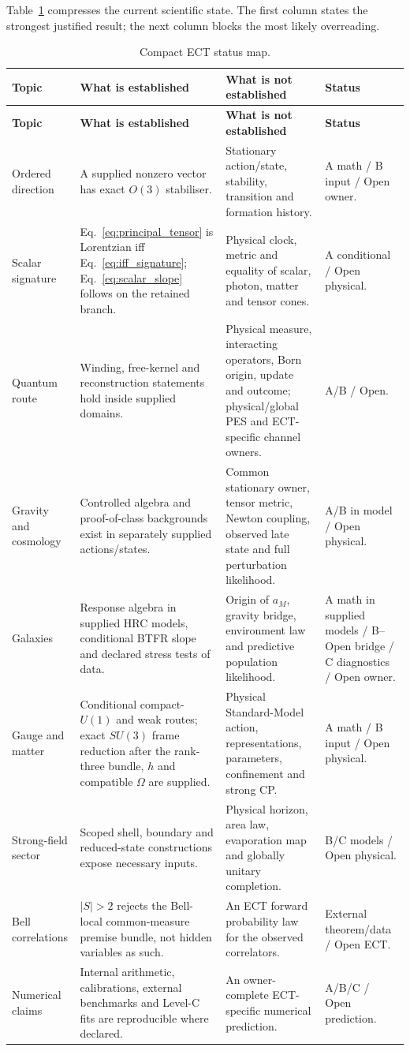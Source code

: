 \documentclass[11pt,a4paper]{article}
\begin{document}
Table~\ref{tab:status_map} compresses the current scientific state.  The
first column states the strongest justified result; the next column blocks
the most likely overreading.

\small
\begin{longtable}{@{}p{2.7cm}p{4.7cm}p{4.7cm}p{2.6cm}@{}}
\caption{Compact ECT status map.}\label{tab:status_map}\\
\toprule
\textbf{Topic} & \textbf{What is established} & \textbf{What is not established} & \textbf{Status}\\
\midrule
\endfirsthead
\toprule
\textbf{Topic} & \textbf{What is established} & \textbf{What is not established} & \textbf{Status}\\
\midrule
\endhead
\bottomrule
\endfoot
Ordered direction & A supplied nonzero vector has exact $O(3)$ stabiliser. & Stationary action/state, stability, transition and formation history. & A math / B input / Open owner.\\
Scalar signature & Eq.~\eqref{eq:principal_tensor} is Lorentzian iff Eq.~\eqref{eq:iff_signature}; Eq.~\eqref{eq:scalar_slope} follows on the retained branch. & Physical clock, metric and equality of scalar, photon, matter and tensor cones. & A conditional / Open physical.\\
Quantum route & Winding, free-kernel and reconstruction statements hold inside supplied domains. & Physical measure, interacting operators, Born origin, update and outcome; physical/global PES and ECT-specific channel owners. & A/B / Open.\\
Gravity and cosmology & Controlled algebra and proof-of-class backgrounds exist in separately supplied actions/states. & Common stationary owner, tensor metric, Newton coupling, observed late state and full perturbation likelihood. & A/B in model / Open physical.\\
Galaxies & Response algebra in supplied HRC models, conditional BTFR slope and declared stress tests of data. & Origin of $a_M$, gravity bridge, environment law and predictive population likelihood. & A math in supplied models / B--Open bridge / C diagnostics / Open owner.\\
Gauge and matter & Conditional compact-$U(1)$ and weak routes; exact $SU(3)$ frame reduction after the rank-three bundle, $h$ and compatible $\Omega$ are supplied. & Physical Standard-Model action, representations, parameters, confinement and strong CP. & A math / B input / Open physical.\\
Strong-field sector & Scoped shell, boundary and reduced-state constructions expose necessary inputs. & Physical horizon, area law, evaporation map and globally unitary completion. & B/C models / Open physical.\\
Bell correlations & $|S|>2$ rejects the Bell-local common-measure premise bundle, not hidden variables as such. & An ECT forward probability law for the observed correlators. & External theorem/data / Open ECT.\\
Numerical claims & Internal arithmetic, calibrations, external benchmarks and Level-C fits are reproducible where declared. & An owner-complete ECT-specific numerical prediction. & A/B/C / Open prediction.\\
\end{longtable}
\end{document}
